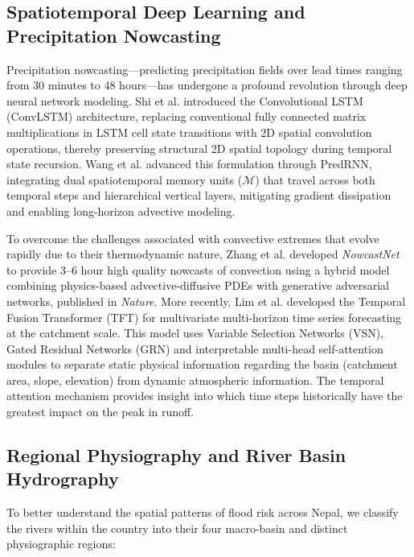 \documentclass[journal]{IEEEtran}
\begin{document}
\subsection{Spatiotemporal Deep Learning and Precipitation Nowcasting}
Precipitation nowcasting---predicting precipitation fields over lead times ranging from 30 minutes to 48 hours---has undergone a profound revolution through deep neural network modeling. Shi et al. \cite{shi2015convolutional} introduced the Convolutional LSTM (ConvLSTM) architecture, replacing conventional fully connected matrix multiplications in LSTM cell state transitions with 2D spatial convolution operations, thereby preserving structural 2D spatial topology during temporal state recursion. Wang et al. \cite{wang2017predrnn} advanced this formulation through PredRNN, integrating dual spatiotemporal memory units ($\mathcal{M}$) that travel across both temporal steps and hierarchical vertical layers, mitigating gradient dissipation and enabling long-horizon advective modeling.

To overcome the challenges associated with convective extremes that evolve rapidly due to their thermodynamic nature, Zhang et al. \cite{zhang2023skilful} developed \textit{NowcastNet} to provide 3--6 hour high quality nowcasts of convection using a hybrid model combining physics-based advective-diffusive PDEs with generative adversarial networks, published in \textit{Nature}. More recently, Lim et al. \cite{lim2021temporal} developed the Temporal Fusion Transformer (TFT) for multivariate multi-horizon time series forecasting at the catchment scale. This model uses Variable Selection Networks (VSN), Gated Residual Networks (GRN) and interpretable multi-head self-attention modules to separate static physical information regarding the basin (catchment area, slope, elevation) from dynamic atmospheric information. The temporal attention mechanism provides insight into which time steps historically have the greatest impact on the peak in runoff.

\subsection{Regional Physiography and River Basin Hydrography}
To better understand the spatial patterns of flood risk across Nepal, we classify the rivers within the country into their four macro-basin and distinct physiographic regions:
\end{document}
